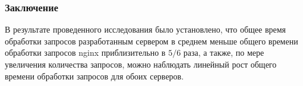 \documentclass[gray]{beamer}
\begin{document}
\begin{frame}
    \frametitle{Заключение}
В результате проведенного исследования было установлено, что общее время обработки запросов разработанным сервером в среднем меньше общего времени обработки запросов nginx приблизительно в ${5}/{6}$ раза, а также, по мере увеличения количества запросов, можно наблюдать линейный рост общего времени обработки запросов для обоих серверов.
\end{frame}
\end{document}
